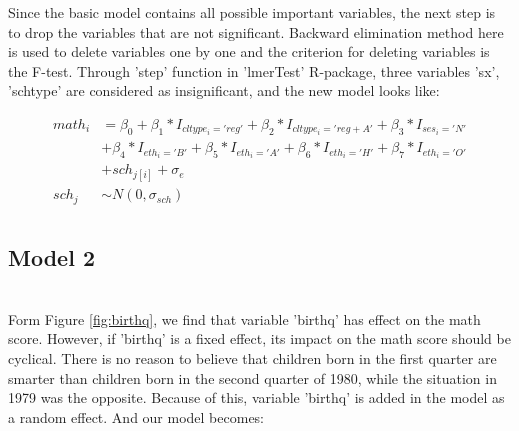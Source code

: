 \documentclass[11pt,a4paper]{article}
\begin{document}
Since the basic model contains all possible important variables, the next step is to drop the variables that are not significant. 
Backward elimination method here is used to delete variables one by one and the criterion for deleting variables is the F-test. 
Through 'step' function in 'lmerTest' R-package, three variables 'sx', 'schtype' are considered as insignificant, 
and the new model looks like:

\begin{align*}
    math_i &= \beta_0 + \beta_1*I_{cltype_i='reg'} + \beta_2*I_{cltype_i='reg+A'} + \beta_3*I_{ses_i='N'} \\
    &+ \beta_4*I_{eth_i='B'} + \beta_5*I_{eth_i='A'} + \beta_6*I_{eth_i='H'} + \beta_7*I_{eth_i='O'} \\
    &+ sch_{j[i]} + \sigma_e\\
    sch_j &\sim N(0, \sigma_{sch})\\
\end{align*}

\subsection{Model 2}



\begin{minipage}{\linewidth}
    \label{fig:birthq}
\end{minipage}\\

Form Figure \ref{fig:birthq}, we find that variable 'birthq' has effect on the math score. 
However, if 'birthq' is a fixed effect, its impact on the math score should be cyclical. 
There is no reason to believe that children born in the first quarter are smarter than children born in the second quarter of 1980, 
while the situation in 1979 was the opposite. 
Because of this, variable 'birthq' is added in the model as a random effect. And our model becomes:
\end{document}
